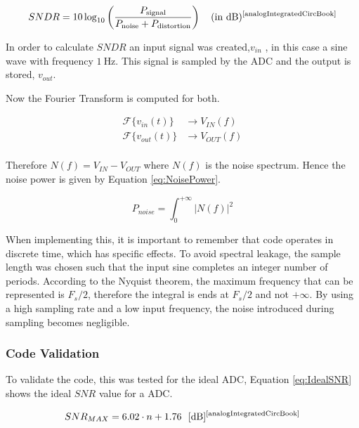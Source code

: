 \begin{equation}
    SNDR = 10 \log_{10} \left( \frac{P_{\text{signal}}}{P_{\text{noise}} + P_{\text{distortion}}} \right)  \quad \text{(in dB)} \textsuperscript{\cite{analogIntegratedCircBook}}
    \label{eq:SNDR}
\end{equation}

In order to calculate $SNDR$ an input signal was created,$v_{in}$ , in this case a sine wave with frequency $\SI{1}{\hertz}$. This signal is sampled by the ADC and the output is stored, $v_{out}$.

Now the Fourier Transform is computed for both.

\begin{equation}
    \begin{split}
        \mathcal{F}\{v_{in}(t)\} &\rightarrow V_{IN}(f)\\
        \mathcal{F}\{v_{out}(t)\} &\rightarrow V_{OUT}(f)\\
    \end{split}
    \label{eq:fourier}
\end{equation}

Therefore $N(f) = V_{IN} - V_{OUT}$ where $N(f)$ is the noise spectrum. Hence the noise power is given by Equation \ref{eq:NoisePower}.

\begin{equation}
    P_{noise} = \int_{0}^{+\infty}|N(f)|^2 
    \label{eq:NoisePower}
\end{equation}

When implementing this, it is important to remember that code operates in discrete time, which has specific effects.  To avoid spectral leakage, the sample length was chosen such that the input sine completes an integer number of periods. According to the Nyquist theorem, the maximum frequency that can be represented is $F_s/2$, therefore the integral is ends at $F_s/2$ and not $+\infty$. By using a high sampling rate and a low input frequency, the noise introduced during sampling becomes negligible.

\subsubsection{Code Validation}

To validate the code, this was tested for the ideal ADC, Equation \ref{eq:IdealSNR} shows the ideal $SNR$ value for a ADC. 

\begin{equation}
    SNR_{MAX} = 6.02\cdot n+1.76~~[\si{\decibel}] \textsuperscript{\cite{analogIntegratedCircBook}}
    \label{eq:IdealSNR}
\end{equation}

